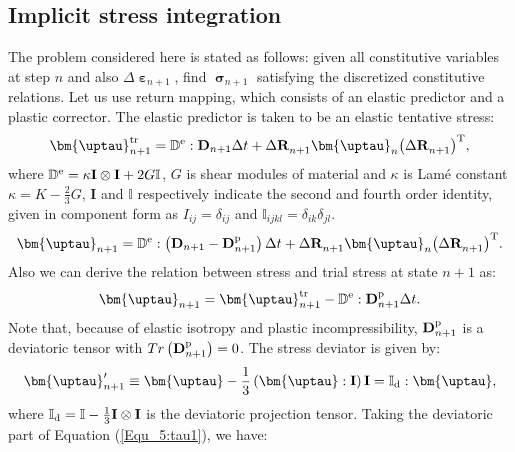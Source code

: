 \subsection{Implicit stress integration}
\noindent
The problem considered here is stated as follows: given all constitutive variables at step $n$ and also $\Delta {{\bm{\upepsilon }}_{n + 1}}$, find $\bm{\upsigma}_{n+1}$  satisfying the discretized constitutive relations. Let us use return mapping, which consists of an elastic predictor and a plastic corrector. The elastic predictor is taken to be an elastic tentative stress:
\begin{equation}
{\bm{\uptau }}_{n + 1}^{\rm tr} = {\mathbb{D}^{\rm{e}}}: {{\mathbf{D}}_{n + 1} \Delta t} + \Delta {\mathbf{R}}_{n + 1}^{}{{\bm{\uptau }}_n}{\left( {\Delta {\mathbf{R}}_{n + 1}^{}} \right)^{\rm{T}}},
\end{equation}
where ${\mathbb{D}^{\rm{e}}} = \kappa {\mathbf{I}} \otimes {\mathbf{I}} + 2G\mathbb{I}$, $G$ is shear modules of material and $\kappa$ is Lam\'{e} constant $\kappa  = K - \frac{2}{3}G$, ${\mathbf{I}}$ and $\mathbb{I}$ respectively indicate the second and fourth order identity, given in component form as ${I_{ij}} = {\delta _{ij}}$ and ${\mathbb{I}_{ijkl}} = {\delta _{ik}}{\delta _{jl}}$.
\begin{equation}
{\bm{\uptau }}_{n + 1} = {\mathbb{D}^{\rm{e}}}: \left( {\mathbf{D}}_{n + 1} -{\mathbf{D}}_{n + 1}^{\rm p} \right) \Delta t + \Delta {\mathbf{R}}_{n + 1}^{}{{\bm{\uptau }}_n}{\left( {\Delta {\mathbf{R}}_{n + 1}^{}} \right)^{\rm{T}}}.
\end{equation}
Also we can derive the relation between stress and trial stress at state $n+1$ as:
\begin{equation}
\label{Equ_5:tau1}
{\bm{\uptau }}_{n + 1} = {\bm{\uptau }}_{n + 1}^{\rm tr} - {\mathbb{D}^{\rm{e}}}: {\mathbf{D}}_{n + 1}^{\rm p} \Delta t.
\end{equation}
Note that, because of elastic isotropy and plastic incompressibility, ${\mathbf{D}}_{n + 1}^{\rm p}$ is a deviatoric tensor with $Tr\left( {\mathbf{D}}_{n + 1}^{\rm p} \right)=0$.
The stress deviator is given by:
\begin{equation}
{\bm{\uptau }}'_{n + 1} \equiv {\bm{\uptau }} - \frac{1}{3}\left( {{\bm{\uptau }}:{\mathbf{I}}} \right){\mathbf{I}} = {\mathbb{I}_{\rm d}}:{\bm{\uptau }},
\end{equation}
where ${\mathbb{I}_{\rm d}} = \mathbb{I} - \frac{1}{3}{\mathbf{I}} \otimes {\mathbf{I}}$ is the deviatoric projection tensor.
Taking the deviatoric part of Equation (\ref{Equ_5:tau1}), we have:
